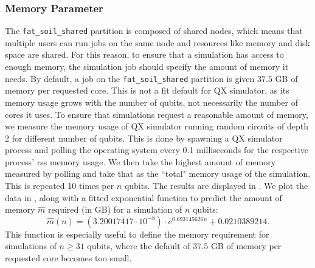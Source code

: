 \clearpage

\subsubsection{Memory Parameter}
The \texttt{fat_soil_shared} partition is composed of shared nodes, which means that multiple users can run jobs on the same node and resources like memory and disk space are shared.
For this reason, to ensure that a simulation has access to enough memory, the simulation job should specify the amount of memory it needs.
By default, a job on the \texttt{fat_soil_shared} partition is given $37.5$ GB of memory per requested core.
This is not a fit default for QX simulator, as its memory usage grows with the number of qubits, not necessarily the number of cores it uses.
To ensure that simulations request a reasonable amount of memory, we measure the memory usage of QX simulator running random circuits of depth 2 for different number of qubits.
This is done by spawning a QX simulator process and polling the operating system every 0.1 milliseconds for the respective process' \gls{rss} memory usage.
We then take the highest amount of memory measured by polling and take that as the ``total" memory usage of the simulation.
This is repeated 10 times per $n$ qubits.
The results are displayed in .
We plot the data in , along with a fitted exponential function to predict the amount of memory $\hat{m}$ required (in GB) for a simulation of $n$ qubits:
\begin{equation}
\hat{m}(n) = \left(3.20017417 \cdot 10^{-8}\right) \cdot e^{0.693145626n} + 0.0210389214.
\end{equation}
This function is especially useful to define the memory requirement for simulations of $n \ge 31$ qubits, where the default of $37.5$ GB of memory per requested core becomes too small.

